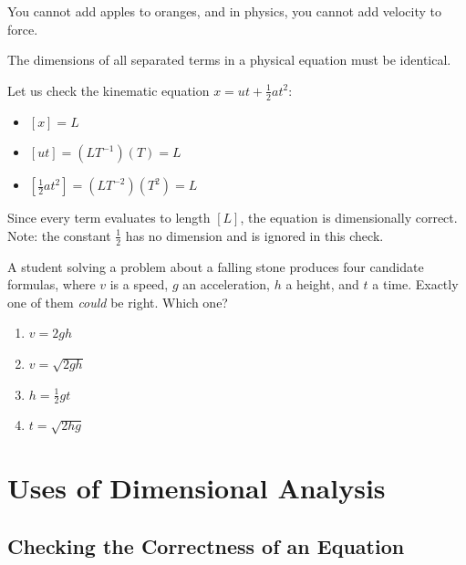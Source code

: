 You cannot add apples to oranges, and in physics, you cannot add velocity to force.

\begin{keybox}
The dimensions of all separated terms in a physical equation must be identical.
\end{keybox}

Let us check the kinematic equation $x = ut + \tfrac{1}{2}at^2$:
\begin{itemize}
  \item $[x] = L$
  \item $[ut] = (LT^{-1})(T) = L$
  \item $[\tfrac{1}{2}at^2] = (LT^{-2})(T^2) = L$
\end{itemize}
Since every term evaluates to length $[L]$, the equation is dimensionally correct. Note: the
constant $\tfrac{1}{2}$ has no dimension and is ignored in this check.

\begin{checkpoint}
A student solving a problem about a falling stone produces four candidate
formulas, where $v$ is a speed, $g$ an acceleration, $h$ a height, and $t$ a
time. Exactly one of them \emph{could} be right. Which one?
\begin{enumerate}[label=(\alph*), leftmargin=2.5em, itemsep=0pt]
  \item $v = 2gh$
  \item $v = \sqrt{2gh}$
  \item $h = \tfrac12 g t$
  \item $t = \sqrt{2h g}$
\end{enumerate}
\end{checkpoint}


\section{Uses of Dimensional Analysis}

\subsection{Checking the Correctness of an Equation}

